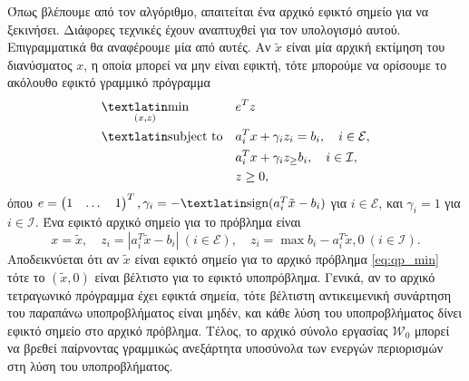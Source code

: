 Όπως βλέπουμε από τον αλγόριθμο, απαιτείται ένα αρχικό εφικτό σημείο
για να ξεκινήσει. Διάφορες τεχνικές έχουν αναπτυχθεί για τον υπολογισμό αυτού.
Επιγραμματικά θα αναφέρουμε μία από αυτές. Αν $\tilde{x}$ είναι μία αρχική εκτίμηση του
διανύσματος $x$, η οποία μπορεί να μην είναι εφικτή, τότε μπορούμε να ορίσουμε το
ακόλουθο εφικτό γραμμικό πρόγραμμα
\begin{equation*}
    \begin{aligned}
        & \underset{(x,z)}{\text{\tl{min}}}
        & & e^Tz\\
        & \text{\tl{subject to}}
        & & a^T_ix + \gamma_iz_i = b_i, \quad i \in \mathcal{E}, \\
        &&& a_i^Tx + \gamma_iz_ \ge b_i, \quad i \in \mathcal{I}, \\
        &&& z \ge 0,
    \end{aligned}
\end{equation*}
όπου $e= \begin{pmatrix}1 & \dots & 1\end{pmatrix}^T, \gamma_i = -
\text{\tl{sign}}(a_i^T\tilde{x}-b_i)$ για $i \in \mathcal{E}$, και $\gamma_i =
1$ για $i \in \mathcal{I}$. Ένα εφικτό αρχικό σημείο για το πρόβλημα είναι
\begin{equation*}
    x = \tilde{x},\quad
    z_i = |a_i^T\tilde{x} - b_i|\ (i \in \mathcal{E}),\quad
    z_i = \max{b_i - a_i^T\tilde{x}, 0}\ (i \in \mathcal{I}).
\end{equation*}
Αποδεικνύεται ότι αν $\tilde{x}$ είναι εφικτό σημείο για το αρχικό πρόβλημα
\eqref{eq:qp_min} τότε το $(\tilde{x}, 0)$ είναι βέλτιστο για το εφικτό
υποπρόβλημα. Γενικά, αν το αρχικό τετραγωνικό πρόγραμμα έχει εφικτά σημεία,
τότε βέλτιστη αντικειμενική συνάρτηση του παραπάνω υποπροβλήματος είναι μηδέν,
και κάθε λύση του υποπροβλήματος δίνει εφικτό σημείο στο αρχικό πρόβλημα. Τέλος,
το αρχικό σύνολο εργασίας $\mathcal{W}_0$ μπορεί να βρεθεί παίρνοντας γραμμικώς
ανεξάρτητα υποσύνολα των ενεργών περιορισμών στη λύση του υποπροβλήματος.

